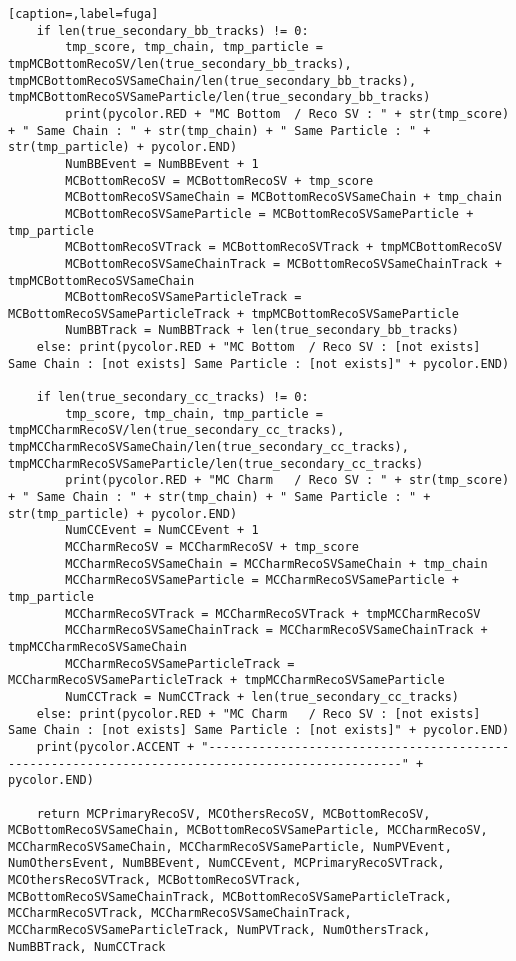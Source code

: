 \begin{lstlisting}[caption=,label=fuga]
    if len(true_secondary_bb_tracks) != 0:
        tmp_score, tmp_chain, tmp_particle = tmpMCBottomRecoSV/len(true_secondary_bb_tracks), tmpMCBottomRecoSVSameChain/len(true_secondary_bb_tracks), tmpMCBottomRecoSVSameParticle/len(true_secondary_bb_tracks)
        print(pycolor.RED + "MC Bottom  / Reco SV : " + str(tmp_score) + " Same Chain : " + str(tmp_chain) + " Same Particle : " + str(tmp_particle) + pycolor.END)
        NumBBEvent = NumBBEvent + 1
        MCBottomRecoSV = MCBottomRecoSV + tmp_score
        MCBottomRecoSVSameChain = MCBottomRecoSVSameChain + tmp_chain
        MCBottomRecoSVSameParticle = MCBottomRecoSVSameParticle + tmp_particle
        MCBottomRecoSVTrack = MCBottomRecoSVTrack + tmpMCBottomRecoSV
        MCBottomRecoSVSameChainTrack = MCBottomRecoSVSameChainTrack + tmpMCBottomRecoSVSameChain
        MCBottomRecoSVSameParticleTrack = MCBottomRecoSVSameParticleTrack + tmpMCBottomRecoSVSameParticle
        NumBBTrack = NumBBTrack + len(true_secondary_bb_tracks)
    else: print(pycolor.RED + "MC Bottom  / Reco SV : [not exists] Same Chain : [not exists] Same Particle : [not exists]" + pycolor.END)
        
    if len(true_secondary_cc_tracks) != 0:
        tmp_score, tmp_chain, tmp_particle = tmpMCCharmRecoSV/len(true_secondary_cc_tracks), tmpMCCharmRecoSVSameChain/len(true_secondary_cc_tracks), tmpMCCharmRecoSVSameParticle/len(true_secondary_cc_tracks)
        print(pycolor.RED + "MC Charm   / Reco SV : " + str(tmp_score)  + " Same Chain : " + str(tmp_chain) + " Same Particle : " + str(tmp_particle) + pycolor.END)
        NumCCEvent = NumCCEvent + 1
        MCCharmRecoSV = MCCharmRecoSV + tmp_score
        MCCharmRecoSVSameChain = MCCharmRecoSVSameChain + tmp_chain
        MCCharmRecoSVSameParticle = MCCharmRecoSVSameParticle + tmp_particle
        MCCharmRecoSVTrack = MCCharmRecoSVTrack + tmpMCCharmRecoSV
        MCCharmRecoSVSameChainTrack = MCCharmRecoSVSameChainTrack + tmpMCCharmRecoSVSameChain
        MCCharmRecoSVSameParticleTrack = MCCharmRecoSVSameParticleTrack + tmpMCCharmRecoSVSameParticle
        NumCCTrack = NumCCTrack + len(true_secondary_cc_tracks)
    else: print(pycolor.RED + "MC Charm   / Reco SV : [not exists] Same Chain : [not exists] Same Particle : [not exists]" + pycolor.END)
    print(pycolor.ACCENT + "-------------------------------------------------------------------------------------------------" + pycolor.END)
		
    return MCPrimaryRecoSV, MCOthersRecoSV, MCBottomRecoSV, MCBottomRecoSVSameChain, MCBottomRecoSVSameParticle, MCCharmRecoSV, MCCharmRecoSVSameChain, MCCharmRecoSVSameParticle, NumPVEvent, NumOthersEvent, NumBBEvent, NumCCEvent, MCPrimaryRecoSVTrack, MCOthersRecoSVTrack, MCBottomRecoSVTrack, MCBottomRecoSVSameChainTrack, MCBottomRecoSVSameParticleTrack, MCCharmRecoSVTrack, MCCharmRecoSVSameChainTrack, MCCharmRecoSVSameParticleTrack, NumPVTrack, NumOthersTrack, NumBBTrack, NumCCTrack



\end{lstlisting}
